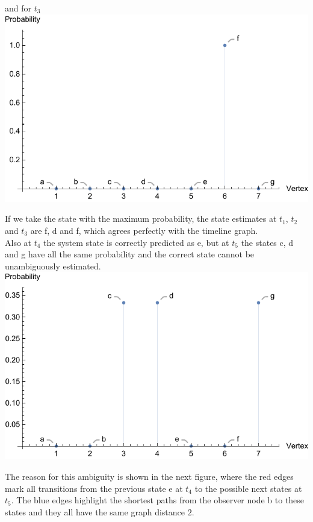 \documentclass{tstextbook}
\begin{document}
\begin{example}
and for $t_3$\\

\includegraphics[scale=0.8, center]{images/state_estimate_t3.pdf}

If we take the state with the maximum probability, the state estimates at $t_1$, $t_2$ and $t_3$ are f, d and f, which agrees perfectly with the timeline graph.\\

Also at $t_4$ the system state is correctly predicted as e, but at $t_5$ the states c, d and g have all the same probability and the correct state cannot be unambiguously estimated.\\

\includegraphics[scale=0.8, center]{images/state_estimate_t5.pdf}

The reason for this ambiguity is shown in the next figure, where the red edges mark all transitions from the previous state e at $t_4$ to the possible next states at $t_5$. The blue edges highlight the shortest paths from the observer node b to these states and they all have the same graph distance $2$.\\


\end{example}
\end{document}
